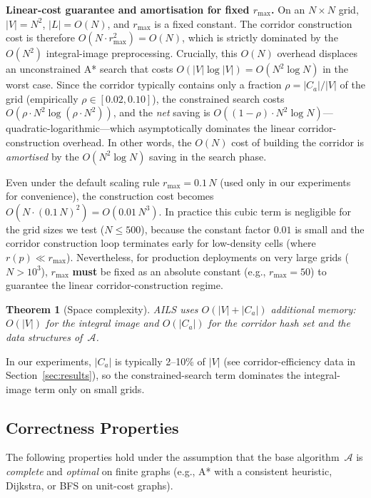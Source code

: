 \documentclass[journal]{IEEEtran}
\newtheorem{theorem}{Theorem}
\begin{document}
\noindent
\textbf{Linear-cost guarantee and amortisation for fixed $r_{\max}$.}
On an $N{\times}N$ grid, $|V| = N^{2}$, $|L| = O(N)$, and $r_{\max}$ is a fixed constant.
The corridor construction cost is therefore $O(N \cdot r_{\max}^{2}) = O(N)$, which is strictly dominated by the $O(N^{2})$ integral-image preprocessing.
Crucially, this $O(N)$ overhead displaces an unconstrained A* search that costs $O(|V| \log |V|) = O(N^{2} \log N)$ in the worst case.
Since the corridor typically contains only a fraction $\rho = |C_a|/|V|$ of the grid (empirically $\rho \in [0.02, 0.10]$), the constrained search costs $O(\rho \cdot N^{2} \log(\rho \cdot N^{2}))$, and the \emph{net} saving is $O((1 - \rho) \cdot N^{2} \log N)$---quadratic-logarithmic---which asymptotically dominates the linear corridor-construction overhead.
In other words, the $O(N)$ cost of building the corridor is \emph{amortised} by the $O(N^{2} \log N)$ saving in the search phase.

Even under the default scaling rule $r_{\max} = 0.1\,N$ (used only in our experiments for convenience), the construction cost becomes $O(N \cdot (0.1\,N)^{2}) = O(0.01\,N^{3})$.
In practice this cubic term is negligible for the grid sizes we test ($N \leq 500$), because the constant factor $0.01$ is small and the corridor construction loop terminates early for low-density cells (where $r(p) \ll r_{\max}$).
Nevertheless, for production deployments on very large grids ($N > 10^{3}$), $r_{\max}$ \textbf{must} be fixed as an absolute constant (e.g., $r_{\max} = 50$) to guarantee the linear corridor-construction regime.

\begin{theorem}[Space complexity]
AILS uses $O(|V| + |C_a|)$ additional memory: $O(|V|)$ for the integral image and $O(|C_a|)$ for the corridor hash set and the data structures of~$\mathcal{A}$.
\end{theorem}

\noindent
In our experiments, $|C_a|$ is typically 2--10\% of $|V|$ (see corridor-efficiency data in Section~\ref{sec:results}), so the constrained-search term dominates the integral-image term only on small grids.

\subsection{Correctness Properties}
\label{sec:correctness}

The following properties hold under the assumption that the base algorithm~$\mathcal{A}$ is \emph{complete} and \emph{optimal} on finite graphs (e.g., A* with a consistent heuristic, Dijkstra, or BFS on unit-cost graphs).
\end{document}
